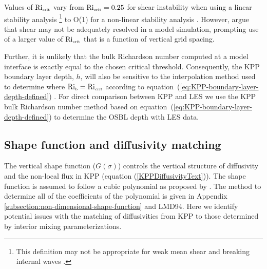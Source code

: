 \documentclass[preprint,12pt,authoryear]{agujournal}
\begin{document}
Values of $\mbox{Ri}_{\mbox{\tiny crit}}$ vary from $\mbox{Ri}_{\mbox{\tiny crit}} = 0.25$ for shear instability when using a linear stability analysis \citep{miles1961stability}\footnote{This definition may not be appropriate for weak mean shear and breaking internal waves \citep{troy2005,barad2010}.} to O(1) for a non-linear stability analysis \citep{abarbanel1984richardson}.  However, \cite{troen1986simple} argue that shear may not be adequately resolved in a model simulation, prompting use of a larger value of $\mbox{Ri}_{\mbox{\tiny crit}}$ that is a function of vertical grid spacing. 


Further, it is  unlikely that the bulk Richardson number computed at a model interface is exactly equal to the chosen critical threshold. Consequently, the KPP boundary layer depth, $h$, will also be sensitive to the interpolation method used to determine where $\mbox{Ri}_{\mbox{\tiny b}} = \mbox{Ri}_{\mbox{\tiny crit}}$ according to equation~(\ref{eq:KPP-boundary-layer-depth-defined}) \citep{Danabasoglu2006,Seidel2010}. For direct comparison between KPP and LES we use the KPP bulk Richardson number method based on equation~(\ref{eq:KPP-boundary-layer-depth-defined}) to determine the OSBL depth with LES data. 

\subsection{Shape function and diffusivity matching}
\label{sec:shapefunc-diffusmatch}
 
The vertical shape function ($G(\sigma)$) controls the vertical structure of diffusivity and the non-local flux in KPP (equation (\ref{KPPDiffusivityText})).  The shape function is assumed to follow a cubic polynomial as proposed by \cite{OBrien1970}.  The method to determine all of the coefficients of the polynomial is given in Appendix \ref{subsection:non-dimensional-shape-function} and LMD94.  Here we identify potential issues with the matching of diffusivities from KPP to those determined by interior mixing parameterizations.
\end{document}
